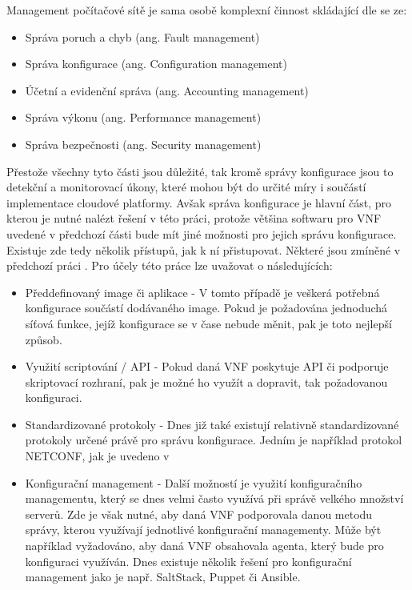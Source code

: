 Management počítačové sítě je sama osobě komplexní činnost skládající dle \cite{network_management} se ze:

\begin{itemize}
\item Správa poruch a chyb (ang. Fault management)
\item Správa konfigurace (ang. Configuration management)
\item Účetní a evidenční správa (ang. Accounting management)
\item Správa výkonu (ang. Performance management) 
\item Správa bezpečnosti (ang. Security management)
\end{itemize}

Přestože všechny tyto části jsou důležité, tak kromě správy konfigurace jsou to detekční a monitorovací úkony, které mohou být do určité míry i součástí implementace cloudové platformy. Avšak správa konfigurace je hlavní část, pro kterou je nutné nalézt řešení v této práci, protože většina softwaru pro VNF uvedené v předchozí části bude mít jiné možnosti pro jejich správu konfigurace. Existuje zde tedy několik přístupů, jak k ní přistupovat. Některé jsou zmíněné v předchozí práci \cite{bakalarka}. Pro účely této práce lze uvažovat o následujících:

\begin{itemize}
\item Předdefinovaný image či aplikace - V tomto případě je veškerá potřebná konfigurace součástí dodávaného image. Pokud je požadována jednoduchá síťová funkce, jejíž konfigurace se v čase nebude měnit, pak je toto nejlepší způsob.
\item Využití scriptování / API - Pokud daná VNF poskytuje API či podporuje skriptovací rozhraní, pak je možné ho využít a dopravit, tak požadovanou konfiguraci.
\item Standardizované protokoly - Dnes již také existují relativně standardizované protokoly určené právě pro správu konfigurace. Jedním je například protokol NETCONF, jak je uvedeno v \cite{network_management}
\item Konfigurační management - Další možností je využití konfiguračního managementu, který se dnes velmi často využívá při správě velkého množství serverů. Zde je však nutné, aby daná VNF podporovala danou metodu správy, kterou využívají jednotlivé konfigurační managementy. Může být například vyžadováno, aby daná VNF obsahovala agenta, který bude pro konfiguraci využíván. Dnes existuje několik řešení pro konfigurační management jako je např. SaltStack, Puppet či Ansible.
\end{itemize}





